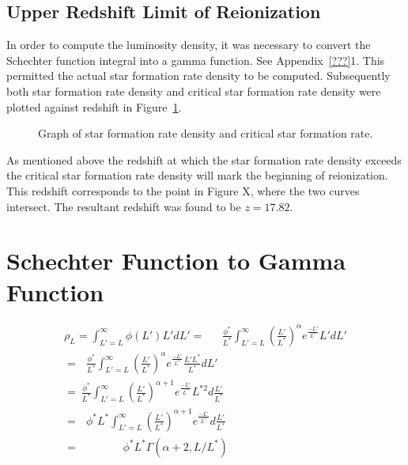 		\subsection{Upper Redshift Limit of Reionization} %
		\label{sub:upper_redshift_limit_of_reionization}
			In order to compute the luminosity density, it was necessary to convert the Schechter function integral into a gamma function. See Appendix~\ref{???}1. This permitted the actual star formation rate density to be computed. Subsequently both star formation rate density and critical star formation rate density were plotted against redshift in Figure~\ref{fig:GRAPH_SFR_CriticalSFR}.
			\begin{figure}[!htbp]
				\centering
					\begingroup{}
						\resizebox{0.8\textwidth}{!}{%
							
						}\endgroup
				\caption{Graph of star formation rate density and critical star formation rate.\label{fig:GRAPH_SFR_CriticalSFR}}
			\end{figure}

			As mentioned above the redshift at which the star formation rate density exceeds the critical star formation rate density will mark the beginning of reionization. This redshift corresponds to the point in Figure X, where the two curves intersect. The resultant redshift was found to be $z=17.82$.


\section{Schechter Function to Gamma Function}

\begin{align}
\rho_L = \int^{\infty}_{L'=L} \phi(L')L'dL'=\ \ \ \ \ \ \ \frac{\phi^*}{L^*}\int^{\infty}_{L'=L}\left (\frac{L'}{L^*} \right )^{\alpha}e^\frac{-L'}{L^*}L'dL'\\
= \ \ \ \frac{\phi^*}{L^*}\int^{\infty}_{L'=L}\left (\frac{L'}{L^*}\right )^{\alpha}e^\frac{-L'}{L^*}\frac{L'L^*}{L^*}dL'\\
= \ \frac {\phi^*}{L^*}\int^{\infty}_{L'=L}\left ( \frac{L'}{L^*} \right )^{\alpha+1}e^\frac{-L'}{L^*}L^{*2}d\frac{L'}{L^*} \\
= \ \ \ \phi^*L^*\int^{\infty}_{L'=L}\left ( \frac{L'}{L^*} \right )^{\alpha+1}e^\frac{-L'}{L^*}d\frac{L'}{L^*} \\
= \ \ \ \ \ \ \ \ \ \ \ \ \ \ \ \ \ \ \phi^*L^*\Gamma(\alpha+2, L/L^*)
\end{align}


